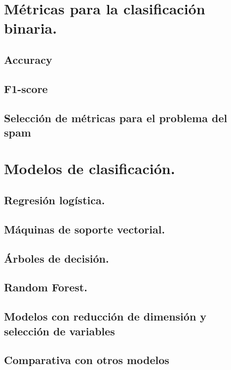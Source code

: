 \documentclass[12pt, letterpaper]{article}
\begin{document}
\section{Métricas para la clasificación binaria.}

\subsection{Accuracy}

\subsection{F1-score}

\subsection{Selección de métricas para el problema del spam}

\section{Modelos de clasificación.}

\subsection{Regresión logística.}

\subsection{Máquinas de soporte vectorial.}

\subsection{Árboles de decisión.}

\subsection{Random Forest.}

\subsection{Modelos con reducción de dimensión y selección de variables}

\subsection{Comparativa con otros modelos}
\end{document}
